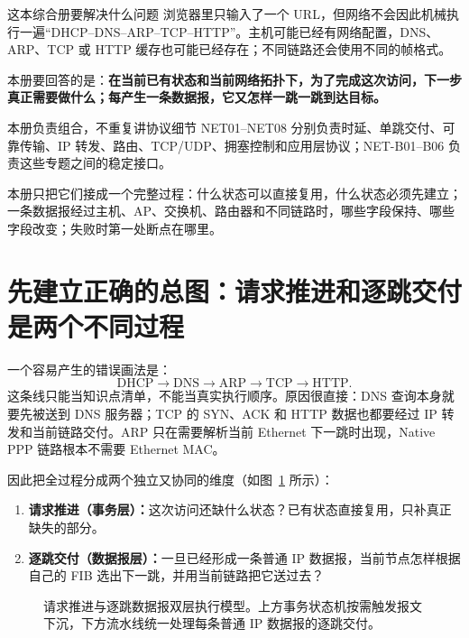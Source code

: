 \documentclass[UTF8,fontset=none,11pt,a4paper]{ctexart}
\begin{document}

\begin{corebox}{这本综合册要解决什么问题}
浏览器里只输入了一个 URL，但网络不会因此机械执行一遍“DHCP--DNS--ARP--TCP--HTTP”。主机可能已经有网络配置，DNS、ARP、TCP 或 HTTP 缓存也可能已经存在；不同链路还会使用不同的帧格式。

本册要回答的是：\textbf{在当前已有状态和当前网络拓扑下，为了完成这次访问，下一步真正需要做什么；每产生一条数据报，它又怎样一跳一跳到达目标。}
\end{corebox}

\begin{methodbox}{本册负责组合，不重复讲协议细节}
NET01--NET08 分别负责时延、单跳交付、可靠传输、IP 转发、路由、TCP/UDP、拥塞控制和应用层协议；NET-B01--B06 负责这些专题之间的稳定接口。

本册只把它们接成一个完整过程：什么状态可以直接复用，什么状态必须先建立；一条数据报经过主机、AP、交换机、路由器和不同链路时，哪些字段保持、哪些字段改变；失败时第一处断点在哪里。
\end{methodbox}

\section{先建立正确的总图：请求推进和逐跳交付是两个不同过程}

一个容易产生的错误画法是：
\[
\text{DHCP}\to\text{DNS}\to\text{ARP}\to\text{TCP}\to\text{HTTP}.
\]
这条线只能当知识点清单，不能当真实执行顺序。原因很直接：DNS 查询本身就要先被送到 DNS 服务器；TCP 的 SYN、ACK 和 HTTP 数据也都要经过 IP 转发和当前链路交付。ARP 只在需要解析当前 Ethernet 下一跳时出现，Native PPP 链路根本不需要 Ethernet MAC。

因此把全过程分成两个独立又协同的维度（如图~\ref{fig:request-and-datagram} 所示）：

\begin{enumerate}
  \item \textbf{请求推进（事务层）：}这次访问还缺什么状态？已有状态直接复用，只补真正缺失的部分。
  \item \textbf{逐跳交付（数据报层）：}一旦已经形成一条普通 IP 数据报，当前节点怎样根据自己的 FIB 选出下一跳，并用当前链路把它送过去？
\end{enumerate}

\begin{figure}[!htbp]
  \centering
  \resizebox{0.92\linewidth}{!}{}
  \caption{请求推进与逐跳数据报双层执行模型。上方事务状态机按需触发报文下沉，下方流水线统一处理每条普通 IP 数据报的逐跳交付。}
  \label{fig:request-and-datagram}
\end{figure}
\end{document}

